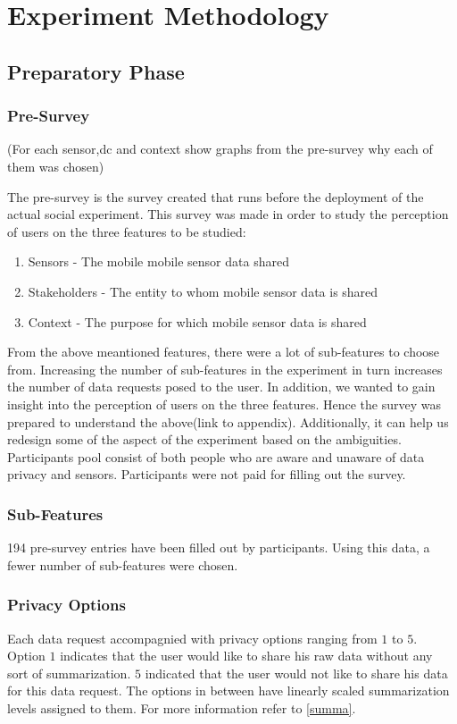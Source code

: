 \chapter{Experiment Methodology}

\section{Preparatory Phase}

\subsection{Pre-Survey}
(For each sensor,dc and context show graphs from the pre-survey why each of them was chosen)

The pre-survey is the survey created that runs before the deployment of the actual social experiment. This
survey was made in order to study the perception of users on the three features to be studied:

\begin{enumerate}
    \item Sensors - The mobile mobile sensor data shared
    \item Stakeholders - The entity to whom mobile sensor data is shared
    \item Context - The purpose for which mobile sensor data is shared
\end{enumerate}

From the above meantioned features, there were a lot of sub-features to choose from.
Increasing the number of sub-features in the experiment in turn increases the number of data requests posed to the user. In addition,
we wanted to gain insight into the perception of users on the three features. Hence the survey
was prepared to understand the above(link to appendix). Additionally, it can help us redesign some of the aspect of the experiment based on the
ambiguities. Participants pool consist of both people who are aware and unaware of data privacy and sensors. Participants were not paid for filling out the survey.

\subsection{Sub-Features}
194 pre-survey entries have been filled out by participants. Using this data, a fewer number of sub-features were chosen.

\subsection{Privacy Options} \label{options}
Each data request accompagnied with privacy options ranging from $1$ to $5$. Option $1$ indicates that the user would like to
share his raw data without any sort of summarization. $5$ indicated that the user would not like to share his data for this data request.
The options in between have linearly scaled summarization levels assigned to them. For more information refer to \ref{summa}.


